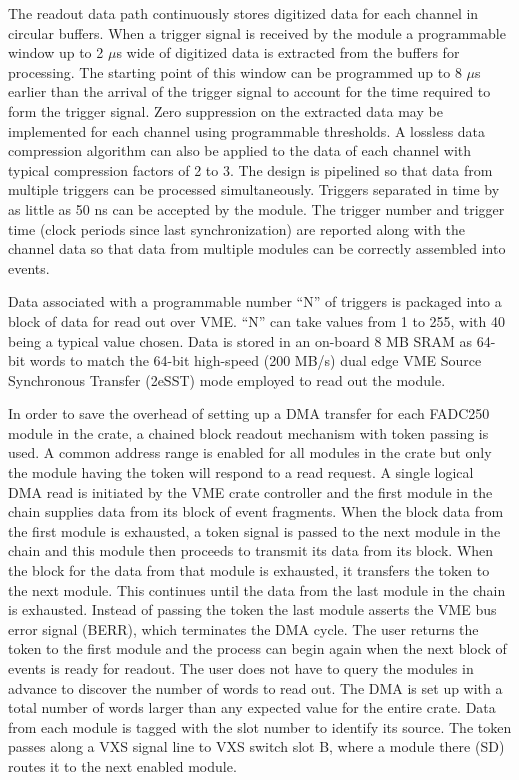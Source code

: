 The readout data path continuously stores digitized data for each channel in circular buffers. When a trigger signal is received by the module a programmable window up to 2 $\mu$s wide of digitized data is extracted from the buffers for processing. The starting point of this window can be programmed up to 8 $\mu$s earlier than the arrival of the trigger signal to account for the time required to form the trigger signal.  Zero suppression on the extracted data may be implemented for each channel using programmable thresholds.  A lossless data compression algorithm can also be applied to the data of each channel with typical compression factors of 2 to 3. The design is pipelined so that data from multiple triggers can be processed simultaneously.  Triggers separated in time by as little as 50 ns can be accepted by the module. The trigger number and trigger time (clock periods since last synchronization) are reported along with the channel data so that data from multiple modules can be correctly assembled into events. 

Data associated with a programmable number ``N'' of triggers is packaged into a block of data for read out over VME.  ``N'' can take values from 1 to 255, with 40 being a typical value chosen.  Data is stored in an on-board 8 MB SRAM as 64-bit words to match the 64-bit high-speed (200 MB/s) dual edge VME Source Synchronous Transfer (2eSST) mode employed to read out the module.  

In order to save the overhead of setting up a DMA transfer for each FADC250 module in the crate, a chained block readout mechanism with token passing is used.  A common address range is enabled for all modules in the crate but only the module having the token will respond to a read request.  A single logical DMA read is initiated by the VME crate controller and the first module in the chain supplies data from its block of event fragments.  When the block data from the first module is exhausted, a token signal is passed to the next module in the chain and this module then proceeds to transmit its data from its block.  When the block for the data from that module is exhausted, it transfers the token to the next module.  This continues until the data from the last module in the chain is exhausted.  Instead of passing the token the last module asserts the VME bus error signal (BERR), which terminates the DMA cycle.  The user returns the token to the first module and the process can begin again when the next block of events is ready for readout.  The user does not have to query the modules in advance to discover the number of words to read out.  The DMA is set up with a total number of words larger than any expected value for the entire crate.  Data from each module is tagged with the slot number to identify its source.  The token passes along a VXS signal line to VXS switch slot B, where a module there (SD) routes it to the next enabled module.


